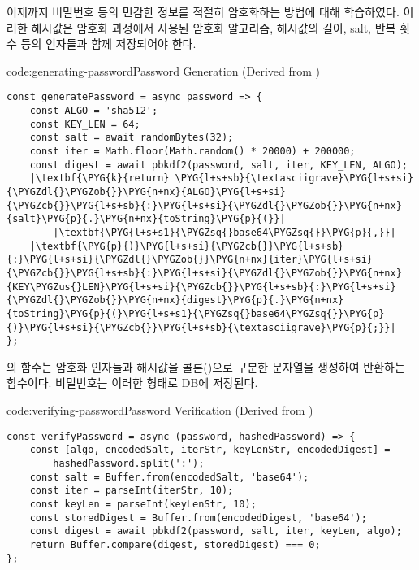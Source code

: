 이제까지 비밀번호 등의 민감한 정보를 적절히 암호화하는 방법에 대해 학습하였다. 이러한 해시값은 암호화 과정에서 사용된 암호화 알고리즘, 해시값의 길이, salt, 반복 횟수 등의 인자들과 함께 저장되어야 한다.

\begin{code}{code:generating-password}{Password Generation (Derived from )}
\begin{verbatim}
const generatePassword = async password => {
    const ALGO = 'sha512';
    const KEY_LEN = 64;
    const salt = await randomBytes(32);
    const iter = Math.floor(Math.random() * 20000) + 200000;
    const digest = await pbkdf2(password, salt, iter, KEY_LEN, ALGO);
    |\textbf{\PYG{k}{return} \PYG{l+s+sb}{\textasciigrave}\PYG{l+s+si}{\PYGZdl{}\PYGZob{}}\PYG{n+nx}{ALGO}\PYG{l+s+si}{\PYGZcb{}}\PYG{l+s+sb}{:}\PYG{l+s+si}{\PYGZdl{}\PYGZob{}}\PYG{n+nx}{salt}\PYG{p}{.}\PYG{n+nx}{toString}\PYG{p}{(}}|
        |\textbf{\PYG{l+s+s1}{\PYGZsq{}base64\PYGZsq{}}\PYG{p}{,}}|
    |\textbf{\PYG{p}{)}\PYG{l+s+si}{\PYGZcb{}}\PYG{l+s+sb}{:}\PYG{l+s+si}{\PYGZdl{}\PYGZob{}}\PYG{n+nx}{iter}\PYG{l+s+si}{\PYGZcb{}}\PYG{l+s+sb}{:}\PYG{l+s+si}{\PYGZdl{}\PYGZob{}}\PYG{n+nx}{KEY\PYGZus{}LEN}\PYG{l+s+si}{\PYGZcb{}}\PYG{l+s+sb}{:}\PYG{l+s+si}{\PYGZdl{}\PYGZob{}}\PYG{n+nx}{digest}\PYG{p}{.}\PYG{n+nx}{toString}\PYG{p}{(}\PYG{l+s+s1}{\PYGZsq{}base64\PYGZsq{}}\PYG{p}{)}\PYG{l+s+si}{\PYGZcb{}}\PYG{l+s+sb}{\textasciigrave}\PYG{p}{;}}|
};
\end{verbatim}
\end{code}


의  함수는 암호화 인자들과 해시값을 콜론(\cd{:})으로 구분한 문자열을 생성하여 반환하는 함수이다. 비밀번호는 이러한 형태로 DB에 저장된다.
\clearpage

\begin{code}{code:verifying-password}{Password Verification (Derived from )}
\begin{verbatim}
const verifyPassword = async (password, hashedPassword) => {
    const [algo, encodedSalt, iterStr, keyLenStr, encodedDigest] =
        hashedPassword.split(':');
    const salt = Buffer.from(encodedSalt, 'base64');
    const iter = parseInt(iterStr, 10);
    const keyLen = parseInt(keyLenStr, 10);
    const storedDigest = Buffer.from(encodedDigest, 'base64');
    const digest = await pbkdf2(password, salt, iter, keyLen, algo);
    return Buffer.compare(digest, storedDigest) === 0;
};
\end{verbatim}
\end{code}

